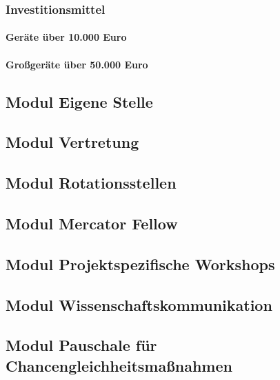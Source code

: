 \documentclass[de]{dfg-proposal}
\begin{document}
\subsubsection{Investitionsmittel}

\paragraph{Geräte über 10.000 Euro}

\paragraph{Großgeräte über 50.000 Euro}

\subsection{Modul Eigene Stelle}

\subsection{Modul Vertretung}

\subsection{Modul Rotationsstellen}

\subsection{Modul Mercator Fellow}

\subsection{Modul Projektspezifische Workshops}

\subsection{Modul Wissenschaftskommunikation}

\subsection{Modul Pauschale für Chancengleichheitsmaßnahmen}
\end{document}
